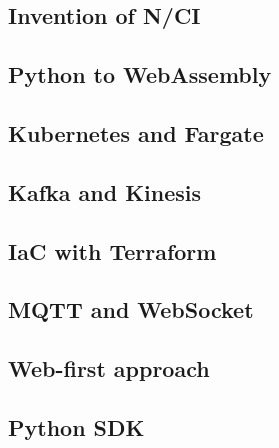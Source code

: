 \subsection{Invention of N/CI}
\label{chapter4-invention-of-nci}

\subsection{Python to WebAssembly}
\label{chapter4-python-to-webassembly}

\subsection{Kubernetes and Fargate}
\label{chapter4-kubernetes-and-aws-fargate}

\subsection{Kafka and Kinesis}
\label{chapter4-kafka-aws-kinesis}

\subsection{IaC with Terraform}
\label{chapter4-iac-with-terraform}

\subsection{MQTT and WebSocket}
\label{chapter4-mqtt-and-websocket}

\subsection{Web-first approach}
\label{chapter4-web-first-approach}

\subsection{Python SDK}
\label{chapter4-python-sdk}

